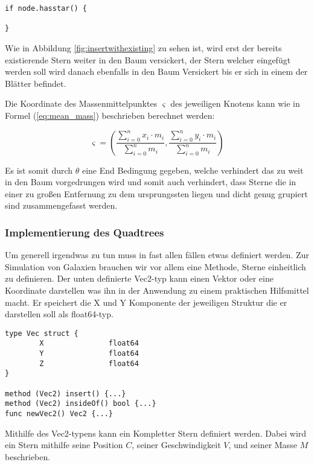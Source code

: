 \begin{lstlisting}
if node.hasstar() {

}
\end{lstlisting}

Wie in Abbildung \ref{fig:insertwithexisting} zu sehen ist, wird erst der
bereits existierende Stern weiter in den Baum versickert, der Stern welcher
eingefügt werden soll wird danach ebenfalls in den Baum Versickert bis er sich
in einem der Blätter befindet.

Die Koordinate des Massenmittelpunktes \( \varsigma \) des jeweiligen Knotens
kann wie in Formel (\ref{eq:mean_mass}) beschrieben berechnet werden:

\begin{equation} \label{eq:mean_mass}
\varsigma = \left( \dfrac{ \displaystyle \sum_{i=0}^{n} x_i \cdot m_i }{
\displaystyle \sum_{i=0}^{n} m_i } , \frac{ \displaystyle \sum_{i=0}^{n} y_i
\cdot m_i }{ \displaystyle \sum_{i=0}^{n} m_i } \right)
\end{equation}

Es ist somit durch \( \theta \) eine End Bedingung gegeben, welche verhindert
das zu weit in den Baum vorgedrungen wird und somit auch verhindert, dass
Sterne die in einer zu großen Entfernung zu dem ursprungssten liegen und dicht
genug grupiert sind zusammengefasst werden.

\subsubsection{Implementierung des Quadtrees}
Um generell irgendwas zu tun muss in fast allen fällen etwas definiert werden.
Zur Simulation von Galaxien brauchen wir vor allem eine Methode, Sterne
einheitlich zu definieren. Der unten definierte Vec2-typ kann einen Vektor oder
eine Koordinate darstellen was ihn in der Anwendung zu einem praktischen
Hilfsmittel macht.  Er speichert die X und Y Komponente der jeweiligen Struktur
die er darstellen soll als float64-typ.

\begin{lstlisting}
type Vec struct {
        X               float64
        Y               float64
        Z               float64
}

method (Vec2) insert() {...}
method (Vec2) insideOf() bool {...}
func newVec2() Vec2 {...}
\end{lstlisting}

Mithilfe des Vec2-typens kann ein Kompletter Stern definiert werden. Dabei wird
ein Stern mithilfe seine Position \( C \), seiner Geschwindigkeit \( V \), und
seiner Masse \( M \) beschrieben.

